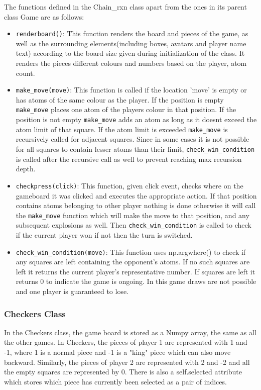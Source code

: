 \documentclass[12pt, letter]{article}
\begin{document}
The functions defined in the Chain\_rxn class apart from the ones in its parent class Game are as follows:
\begin{itemize}
    \item \texttt{renderboard()}: This function renders the board and pieces of the game, as well as the surrounding elements(including boxes, avatars and player name text) according to the board size given during initialization of the class. It renders the pieces different colours and numbers based on the player, atom count.
    \item \texttt{make\_move(move)}: This function is called if the location 'move' is empty or has atoms of the same colour as the player. If the position is empty \texttt{make\_move} places one atom of the players colour in that position. If the position is not empty \texttt{make\_move} adds an atom as long as it doesnt exceed the atom limit of that square. If the atom limit is exceeded \texttt{make\_move} is recursively called for adjacent squares. Since in some cases it is not possible for all squares to contain lesser atoms than their limit, \texttt{check\_win\_condition} is called after the recursive call as well to prevent reaching max recursion depth. 
    \item \texttt{checkpress(click)}: This function, given click event, checks where on the gameboard it was clicked and executes the appropriate action. If that position contains atoms belonging to other player nothing is done  otherwise  it will call the \texttt{make\_move} function which will make the move to that position, and any subsequent explosions as well. Then \texttt{check\_win\_condition} is called to check if the current player won if not then the turn is switched.
    \item \texttt{check\_win\_condition(move)}: This function 
    uses np.argwhere() to check if any squares are left containing the opponent's atoms. If no such squares are left it returns the current player's representative number. If squares are left it returns 0 to indicate the game is ongoing. In this game draws are not possible and one player is guaranteed to lose.
\end{itemize}
\subsubsection{Checkers Class}
In the Checkers class, the game board is stored as a Numpy array, the same as all the other games. In Checkers, the pieces of player 1 are represented with 1 and -1, where 1 is a normal piece and -1 is a "king" piece which can also move backward. Similarly, the pieces of player 2 are represented with 2 and -2 and all the empty squares are represented by 0.
There is also a self.selected attribute which stores which piece has currently been selected as a pair of indices.
\end{document}
